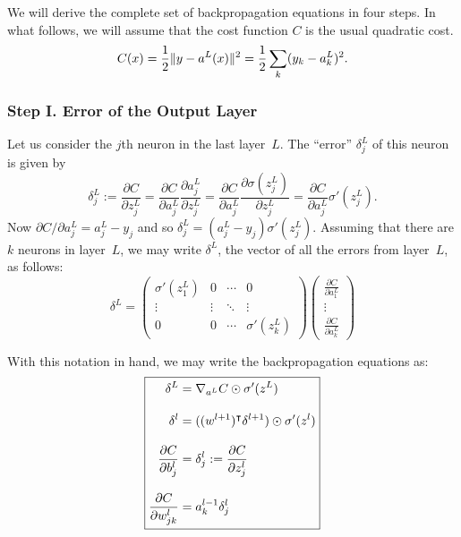 We will derive the complete set of backpropagation equations in four steps. In what
follows, we will assume that the cost function $C$ is the usual quadratic cost.
\[
    C(x) = \frac{1}{2} \lVert y - a^L(x)\rVert^2 = \frac{1}{2} \sum_{k} (y_k - a_k^L)^2.
\]
\subsubsection{Step I. Error of the Output Layer}
Let us consider the $j$th neuron in the last layer~$L$. The ``error'' $\delta_j^L$
of this neuron is given by
\[
    \delta_j^L := \frac{\partial C}{\partial z_j^L}
    = \frac{\partial C}{\partial a_j^L} \frac{\partial a_j^L}{\partial z_j^L}
    = \frac{\partial C}{\partial a_j^L} \frac{\partial \sigma(z_j^L)}{\partial z_j^L}
    = \frac{\partial C}{\partial a_j^L} \sigma'(z_j^L).
\]
Now $\partial C / \partial a_j^L = a_j^L - y_j$ and so
$\delta_j^L = (a_j^L - y_j) \sigma'(z_j^L)$. Assuming that there are $k$ neurons
in layer~$L$, we may write $\delta^L$, the vector of all the errors from layer~$L$,
as follows:
\begin{equation}
    \delta^L =
    \begin{pmatrix}
        \sigma'(z_1^L)  & 0              & \cdots & 0 \\
        \vdots          & \vdots         & \ddots & \vdots  \\
        0               & 0              & \cdots & \sigma'(z_k^L)
    \end{pmatrix}
    \begin{pmatrix}
        \frac{\partial C}{\partial a_1^L} \\
        \vdots \\
        \frac{\partial C}{\partial a_k^L}
    \end{pmatrix}
\end{equation}



With this notation in hand, we may write the backpropagation equations
as:
\begin{equation}
\boxed{
\setlength{\jot}{12pt}
\begin{aligned}
    \delta^{L} & = \nabla_{a^L} C \odot \sigma'(z^L) \\
    \delta^{l} & = ( \trans{(w^{l + 1})} \delta^{l + 1} ) \odot \sigma'(z^l) \\
    \frac{\partial C}{\partial b_j^{l}} & = \delta_{j}^l := \frac{\partial C}{\partial z_j^l}\\
    \frac{\partial C}{\partial w_{j k}^l} & = a_{k}^{l - 1} \delta_{j}^l
\end{aligned}
}
\end{equation}

